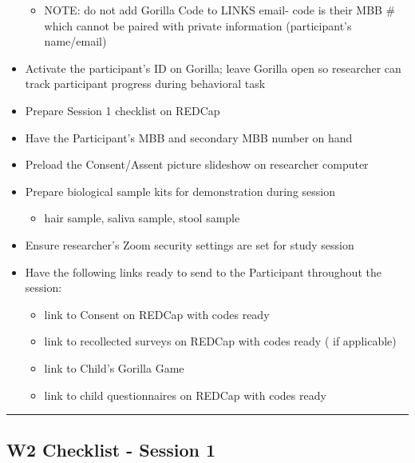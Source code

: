 \documentclass[]{book}
\providecommand{\tightlist}{%
  \setlength{\itemsep}{0pt}\setlength{\parskip}{0pt}}
\begin{document}
\begin{itemize}
  \begin{itemize}
  \tightlist
  \item
    NOTE: do not add Gorilla Code to LINKS email- code is their MBB \# which cannot be paired with private information (participant's name/email)
  \end{itemize}
\item
  Activate the participant's ID on Gorilla; leave Gorilla open so researcher can track participant progress during behavioral task
\item
  Prepare Session 1 checklist on REDCap
\item
  Have the Participant's MBB and secondary MBB number on hand
\item
  Preload the Consent/Assent picture slideshow on researcher computer
\item
  Prepare biological sample kits for demonstration during session

  \begin{itemize}
  \tightlist
  \item
    hair sample, saliva sample, stool sample
  \end{itemize}
\item
  Ensure researcher's Zoom security settings are set for study session
\item
  Have the following links ready to send to the Participant throughout the session:

  \begin{itemize}
  \tightlist
  \item
    link to Consent on REDCap with codes ready
  \item
    link to recollected surveys on REDCap with codes ready ( if applicable)
  \item
    link to Child's Gorilla Game
  \item
    link to child questionnaires on REDCap with codes ready
  \end{itemize}
\end{itemize}

\begin{center}\rule{0.5\linewidth}{0.5pt}\end{center}

\hypertarget{w2-checklist---session-1}{%
\subsection{W2 Checklist - Session 1}\label{w2-checklist---session-1}}
\end{document}
